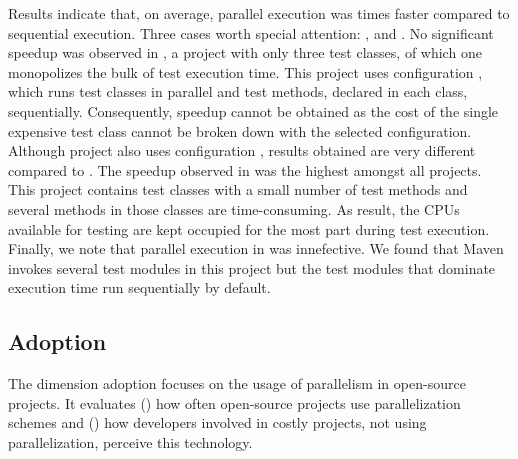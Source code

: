 Results indicate that, on average, parallel execution was
\avgSpeedup{} times faster compared to sequential execution.  Three
cases worth special attention: ,  and
.  No significant speedup was observed in
, a project with only three test classes, of which one
monopolizes the bulk of test execution time.  This project uses
configuration \ParClassSeqMeth{}, which runs test classes in parallel
and test methods, declared in each class, sequentially.  Consequently,
speedup cannot be obtained as the cost of the single expensive test
class cannot be broken down with the selected configuration.  Although
project  also uses configuration \ParClassSeqMeth{},
results obtained are very different compared to .  The
speedup observed in  was the highest amongst all
projects.  This project contains test classes with a small number of
test methods and several methods in those classes are time-consuming.
As result, the CPUs available for testing are kept occupied for the
most part during test execution.  Finally, we note that parallel
execution in  was innefective.  We found that Maven
invokes several test modules in this project but the test modules that
dominate execution time run sequentially by default.


\begin{center}
\end{center}

\subsection{Adoption}
\label{sec:rqC}
\label{sec:rqE}

The dimension adoption focuses on the usage of parallelism in
open-source projects.  It evaluates (\numRQC) how often open-source
projects use parallelization schemes and (\numRQE) how developers
involved in costly projects, not using parallelization, perceive this
technology.


